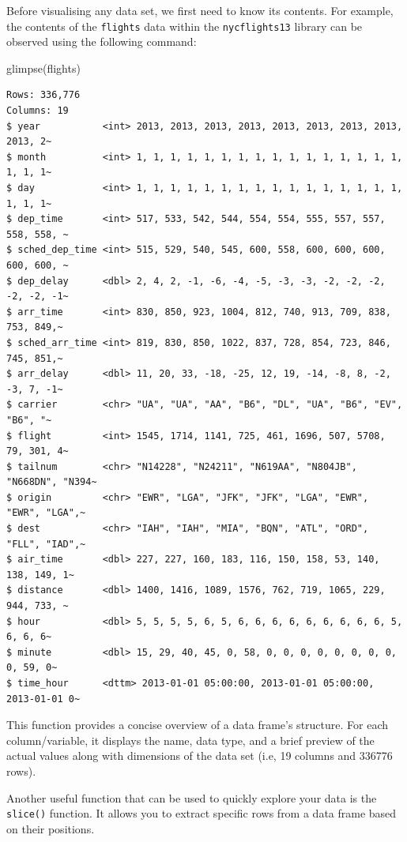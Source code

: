 \documentclass[
  letterpaper,
  DIV=11,
  numbers=noendperiod]{scrartcl}
\newenvironment{Shaded}{\begin{snugshade}}{\end{snugshade}}
\newcommand{\FunctionTok}[1]{\textcolor[rgb]{0.28,0.35,0.67}{#1}}
\newcommand{\NormalTok}[1]{\textcolor[rgb]{0.00,0.23,0.31}{#1}}
\begin{document}
Before visualising any data set, we first need to know its contents. For
example, the contents of the \texttt{flights} data within the
\texttt{nycflights13} library can be observed using the following
command:

\begin{Shaded}
\begin{Highlighting}[]
\FunctionTok{glimpse}\NormalTok{(flights)}
\end{Highlighting}
\end{Shaded}

\begin{verbatim}
Rows: 336,776
Columns: 19
$ year           <int> 2013, 2013, 2013, 2013, 2013, 2013, 2013, 2013, 2013, 2~
$ month          <int> 1, 1, 1, 1, 1, 1, 1, 1, 1, 1, 1, 1, 1, 1, 1, 1, 1, 1, 1~
$ day            <int> 1, 1, 1, 1, 1, 1, 1, 1, 1, 1, 1, 1, 1, 1, 1, 1, 1, 1, 1~
$ dep_time       <int> 517, 533, 542, 544, 554, 554, 555, 557, 557, 558, 558, ~
$ sched_dep_time <int> 515, 529, 540, 545, 600, 558, 600, 600, 600, 600, 600, ~
$ dep_delay      <dbl> 2, 4, 2, -1, -6, -4, -5, -3, -3, -2, -2, -2, -2, -2, -1~
$ arr_time       <int> 830, 850, 923, 1004, 812, 740, 913, 709, 838, 753, 849,~
$ sched_arr_time <int> 819, 830, 850, 1022, 837, 728, 854, 723, 846, 745, 851,~
$ arr_delay      <dbl> 11, 20, 33, -18, -25, 12, 19, -14, -8, 8, -2, -3, 7, -1~
$ carrier        <chr> "UA", "UA", "AA", "B6", "DL", "UA", "B6", "EV", "B6", "~
$ flight         <int> 1545, 1714, 1141, 725, 461, 1696, 507, 5708, 79, 301, 4~
$ tailnum        <chr> "N14228", "N24211", "N619AA", "N804JB", "N668DN", "N394~
$ origin         <chr> "EWR", "LGA", "JFK", "JFK", "LGA", "EWR", "EWR", "LGA",~
$ dest           <chr> "IAH", "IAH", "MIA", "BQN", "ATL", "ORD", "FLL", "IAD",~
$ air_time       <dbl> 227, 227, 160, 183, 116, 150, 158, 53, 140, 138, 149, 1~
$ distance       <dbl> 1400, 1416, 1089, 1576, 762, 719, 1065, 229, 944, 733, ~
$ hour           <dbl> 5, 5, 5, 5, 6, 5, 6, 6, 6, 6, 6, 6, 6, 6, 6, 5, 6, 6, 6~
$ minute         <dbl> 15, 29, 40, 45, 0, 58, 0, 0, 0, 0, 0, 0, 0, 0, 0, 59, 0~
$ time_hour      <dttm> 2013-01-01 05:00:00, 2013-01-01 05:00:00, 2013-01-01 0~
\end{verbatim}

This function provides a concise overview of a data frame's structure.
For each column/variable, it displays the name, data type, and a brief
preview of the actual values along with dimensions of the data set (i.e,
19 columns and 336776 rows).

Another useful function that can be used to quickly explore your data is
the \texttt{slice()} function. It allows you to extract specific rows
from a data frame based on their positions.
\end{document}
